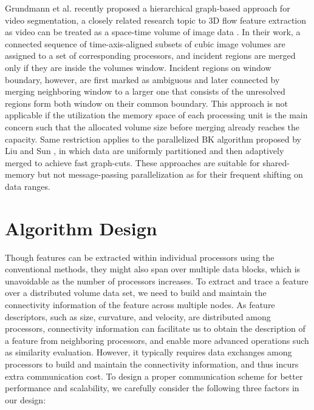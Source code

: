 \documentclass[10pt, conference, compsocconf]{IEEEtran}
\begin{document}
Grundmann et al. \cite{Grundmann2010} recently proposed a hierarchical graph-based approach for video segmentation, a closely related research topic to 3D flow feature extraction as video can be treated as a space-time volume of image data \cite{Klein2002}. In their work, a connected sequence of time-axis-aligned subsets of cubic image volumes are assigned to a set of corresponding processors, and incident regions are merged only if they are inside the volumes window. Incident regions on window boundary, however, are first marked as ambiguous and later connected by merging neighboring window to a larger one that consists of the unresolved regions form both window on their common boundary. This approach is not applicable if the utilization the memory space of each processing unit is the main concern such that the allocated volume size before merging already reaches the capacity. Same restriction applies to the parallelized BK algorithm \cite{Boykov2004} proposed by Liu and Sun \cite{Liu2010}, in which data are uniformly partitioned and then adaptively merged to achieve fast graph-cuts. These approaches are suitable for shared-memory but not message-passing parallelization as for their frequent shifting on data ranges.

\section{Algorithm Design}
Though features can be extracted within individual processors using the conventional methods, they might also span over multiple data blocks, which is unavoidable as the number of processors increases. To extract and trace a feature over a distributed volume data set, we need to build and maintain the connectivity information of the feature across multiple nodes. As feature descriptors, such as size, curvature, and velocity, are distributed among processors, connectivity information can facilitate us to obtain the description of a feature from neighboring processors, and enable more advanced operations such as similarity evaluation.
However, it typically requires data exchanges among processors to build and maintain the connectivity information, and thus incurs extra communication cost. To design a proper communication scheme for better performance and scalability, we carefully consider the following three factors in our design:
\end{document}
